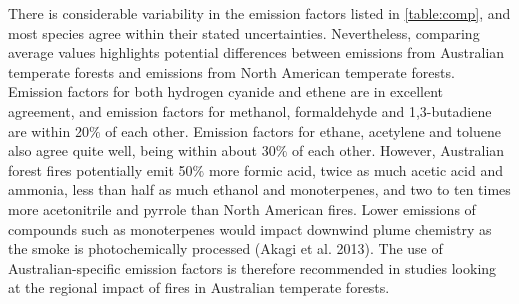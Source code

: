\documentclass[acp, manuscript]{copernicus}
\providecommand{\DIFadd}[1]{{\protect\color{blue}\uwave{#1}}} %
\providecommand{\DIFaddbegin}{} %
\providecommand{\DIFaddend}{} %
\providecommand{\DIFdelbegin}{} %
\begin{document}
There is considerable variability in the emission factors listed in \DIFaddbegin \DIFadd{Table~}\DIFaddend \ref{table:comp}, and most species agree within their stated uncertainties. Nevertheless, comparing average values highlights potential differences between emissions from Australian temperate forests and emissions from North American temperate forests. Emission  factors for both hydrogen cyanide and ethene are in excellent agreement, and emission factors for methanol, formaldehyde and 1,3-butadiene are within 20$\%$ of each other. Emission factors for ethane, acetylene and toluene also agree quite well, being within about 30$\%$ of each other. However, Australian forest fires potentially emit 50$\%$ more formic acid, twice as much acetic acid and ammonia, less than half as much ethanol and monoterpenes, and two to ten times more acetonitrile and pyrrole than North American fires. Lower emissions of compounds such as monoterpenes would impact downwind plume chemistry as the smoke is photochemically processed (Akagi et al. 2013). The use of Australian-specific emission factors is therefore recommended in studies looking at the regional impact of fires in Australian temperate forests. 


\DIFdelbegin %
\end{document}
